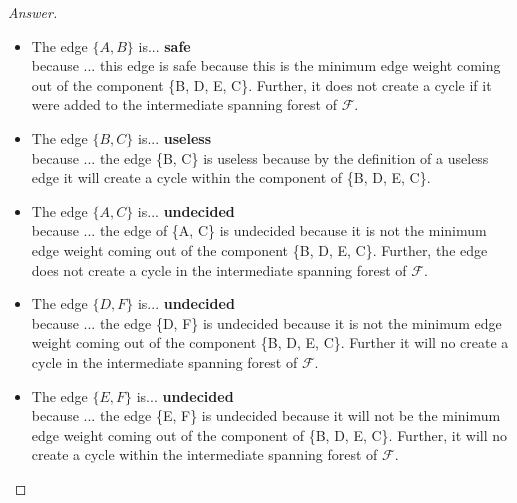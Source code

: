 \documentclass[11pt]{article}
\theoremstyle{definition}
\theoremstyle{definition}
\theoremstyle{definition}
\begin{document}
\begin{proof}[Answer]
\begin{itemize}
\item The edge $\{A,B\}$ is... \textbf{safe} \\ %
because ... this edge is safe because this is the minimum edge weight coming out of the component \{B, D, E, C\}. Further, it does not create a cycle if it were added to the intermediate spanning forest of  $\mathcal{F}$.%
\item The edge $\{B,C\}$ is... \textbf{useless}\\  %
because ... the edge \{B, C\} is useless because by the definition of a useless edge it will create a cycle within the component of  \{B, D, E, C\}. %
\item The edge $\{A, C\}$ is...  \textbf{undecided}\\%
because ... the edge of \{A, C\} is undecided because it is not the minimum edge weight coming out of the component \{B, D, E, C\}. Further, the edge does not create a cycle in the intermediate spanning forest of $\mathcal{F}$.%
\item The edge $\{D, F\}$ is... \textbf{undecided}\\ %
because ... the edge \{D, F\} is undecided because it is not the minimum edge weight coming out of the component \{B, D, E, C\}. Further it will no create a cycle in the intermediate spanning forest of $\mathcal{F}$.%
\item The edge $\{E, F\}$ is... \textbf{undecided} \\ %
because ... the edge \{E, F\} is undecided because it will not be the minimum edge weight coming out of the component of \{B, D, E, C\}. Further, it will no create a cycle within the intermediate spanning forest of $\mathcal{F}$.%
\end{itemize}
\end{proof}




\end{document}
